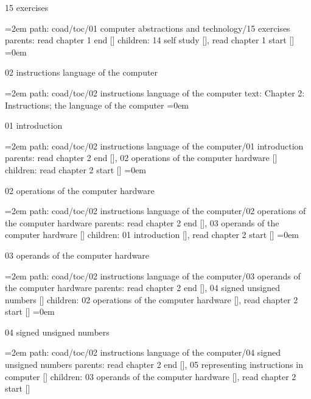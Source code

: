 \bigskip
{}
15 exercises
\smallskip
\par\begingroup
\leftskip=2em
path: coad/toc/01 computer abstractions and technology/15 exercises
\smallskip
parents:  read chapter 1 end []
\smallskip
children: 14 self study [], read chapter 1 start []
\smallskip
\leftskip=0em
\par\endgroup
\bigskip
{}
02 instructions language of the computer
\smallskip
\par\begingroup
\leftskip=2em
path: coad/toc/02 instructions language of the computer
\smallskip
text:  Chapter 2: Instructions; the language of the computer
\smallskip
\leftskip=0em
\par\endgroup
\bigskip
{}
01 introduction
\smallskip
\par\begingroup
\leftskip=2em
path: coad/toc/02 instructions language of the computer/01 introduction
\smallskip
parents:  read chapter 2 end [], 02 operations of the computer hardware []
\smallskip
children: read chapter 2 start []
\smallskip
\leftskip=0em
\par\endgroup
\bigskip
{}
02 operations of the computer hardware
\smallskip
\par\begingroup
\leftskip=2em
path: coad/toc/02 instructions language of the computer/02 operations of the computer hardware
\smallskip
parents:  read chapter 2 end [], 03 operands of the computer hardware []
\smallskip
children: 01 introduction [], read chapter 2 start []
\smallskip
\leftskip=0em
\par\endgroup
\bigskip
{}
03 operands of the computer hardware
\smallskip
\par\begingroup
\leftskip=2em
path: coad/toc/02 instructions language of the computer/03 operands of the computer hardware
\smallskip
parents:  read chapter 2 end [], 04 signed unsigned numbers []
\smallskip
children: 02 operations of the computer hardware [], read chapter 2 start []
\smallskip
\leftskip=0em
\par\endgroup
\bigskip
{}
04 signed unsigned numbers
\smallskip
\par\begingroup
\leftskip=2em
path: coad/toc/02 instructions language of the computer/04 signed unsigned numbers
\smallskip
parents:  read chapter 2 end [], 05 representing instructions in computer []
\smallskip
children: 03 operands of the computer hardware [], read chapter 2 start []
